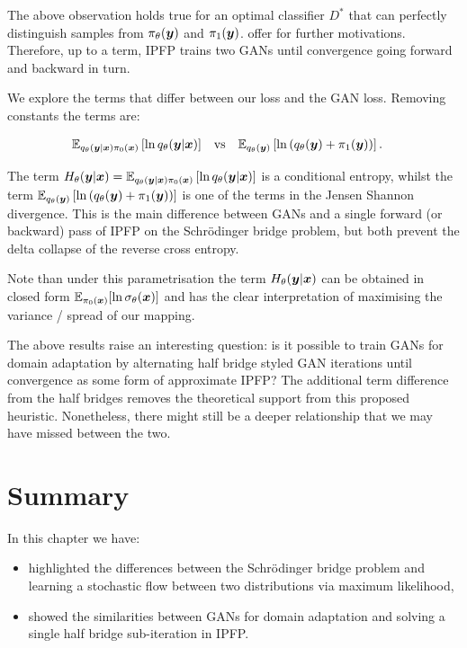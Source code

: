 \documentclass[a4paper,12pt,twoside,openright]{report}
\theoremstyle{definition}
\begin{document}
The above observation holds true for an optimal classifier $D^{*}$ that can perfectly distinguish samples from $\pi_\theta({\bm{y}})$ and $\pi_1({\bm{y}})$. \cite{mohamed2016learning} offer for further motivations. Therefore, up to a term, IPFP trains two GANs until convergence going forward and backward in turn.

We explore the terms that differ between our loss and the GAN loss. Removing constants the terms are:

\begin{align}
 \mathbb{E}_{q_{\theta}({\bm{y}}|{\bm{x}})\pi_0({\bm{x}})}\left[ \operatorname{ln} q_{\theta}({\bm{y}}|{\bm{x}}) \right]\quad &\text{vs} \quad  \mathbb{E}_{q_{\theta}({\bm{y}})}\left[\operatorname{ln}\left(q_{\theta}({\bm{y}}) + \pi_1({\bm{y}})\right)\right].
\end{align}

The term $H_{\theta}({\bm{y}}|{\bm{x}}) =\mathbb{E}_{q_{\theta}({\bm{y}}|{\bm{x}})\pi_0({\bm{x}})}\left[ \operatorname{ln} q_{\theta}({\bm{y}}|{\bm{x}}) \right]$ is a conditional entropy, whilst the term $\mathbb{E}_{q_{\theta}({\bm{y}})}\left[\operatorname{ln}\left(q_{\theta}({\bm{y}}) + \pi_1({\bm{y}})\right)\right]$ is one of the terms in the Jensen Shannon divergence. This is the main difference between GANs and a single forward (or backward) pass of IPFP on the Schrödinger bridge problem, but both prevent the delta collapse of the reverse cross entropy.

Note than under this parametrisation the term $H_{\theta}({\bm{y}}|{\bm{x}})$ can be obtained in closed form $\mathbb{E}_{\pi_0({\bm{x}})}[\operatorname{ln} {\sigma}_{\theta}({\bm{x}})]$ and has the clear interpretation of maximising the variance / spread of our mapping.
 
The above results raise an interesting question: is it possible to train GANs for domain adaptation by alternating half bridge styled GAN iterations until convergence as some form of approximate IPFP? The additional term difference from the half bridges removes the theoretical support from this proposed heuristic. Nonetheless, there might still be a deeper relationship that we may have missed between the two.

\section{Summary}

In this chapter we have:

\begin{itemize}
    \item highlighted the differences between the Schrödinger bridge problem and learning a stochastic flow between two distributions via maximum likelihood,
    \item showed the similarities between GANs for domain adaptation and solving a single half bridge sub-iteration in IPFP.
\end{itemize}
\end{document}
